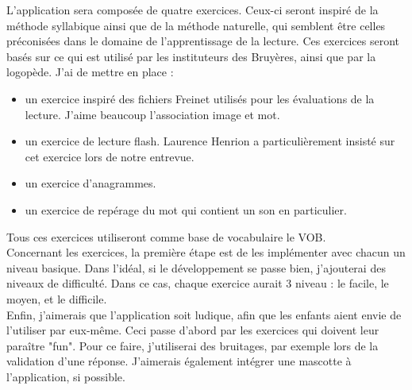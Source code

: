 L'application sera composée de quatre exercices. Ceux-ci seront inspiré de la méthode syllabique ainsi que de la méthode naturelle, qui semblent être celles préconisées dans le domaine de l'apprentissage de la lecture. Ces exercices seront basés sur ce qui est utilisé par les instituteurs des Bruyères, ainsi que par la logopède. J'ai de mettre en place :
\begin{itemize}
\item un exercice inspiré des fichiers Freinet utilisés pour les évaluations de la lecture. J'aime beaucoup l'association image et mot.
\item un exercice de lecture flash. Laurence Henrion a particulièrement insisté sur cet exercice lors de notre entrevue.
\item un exercice d'anagrammes.
\item un exercice de repérage du mot qui contient un son en particulier.
\end{itemize}
Tous ces exercices utiliseront comme base de vocabulaire le VOB.\\

Concernant les exercices, la première étape est de les implémenter avec chacun un niveau basique. Dans l'idéal, si le développement se passe bien, j'ajouterai des niveaux de difficulté. Dans ce cas, chaque exercice aurait 3 niveau : le facile, le moyen, et le difficile.\\

Enfin, j'aimerais que l'application soit ludique, afin que les enfants aient envie de l'utiliser par eux-même. Ceci passe d'abord par les exercices qui doivent leur paraître "fun". Pour ce faire, j'utiliserai des bruitages, par exemple lors de la validation d'une réponse. J'aimerais également intégrer une mascotte à l'application, si possible.